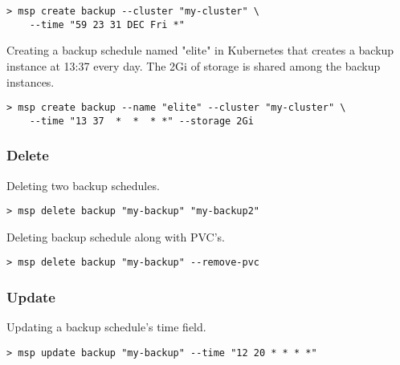 \begin{lstlisting}
> msp create backup --cluster "my-cluster" \
	--time "59 23 31 DEC Fri *"
\end{lstlisting}

\noindent Creating a backup schedule named "elite" in Kubernetes that creates 
a backup instance at 13:37 every day. The 2Gi of storage is shared among
the backup instances.

\begin{lstlisting}
> msp create backup --name "elite" --cluster "my-cluster" \
	--time "13 37  *  *  * *" --storage 2Gi
\end{lstlisting}

\subsubsection*{Delete}
\noindent Deleting two backup schedules.

\begin{lstlisting}
> msp delete backup "my-backup" "my-backup2"
\end{lstlisting}

\noindent Deleting backup schedule along with PVC's.

\begin{lstlisting}
> msp delete backup "my-backup" --remove-pvc
\end{lstlisting}

\subsubsection*{Update}
\noindent Updating a backup schedule's time field.

\begin{lstlisting}
> msp update backup "my-backup" --time "12 20 * * * *"
\end{lstlisting}
